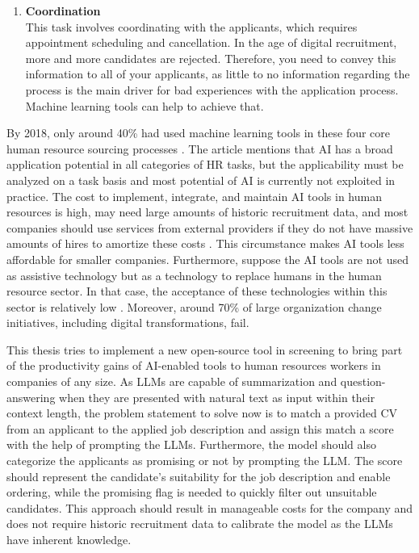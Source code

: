 \documentclass[draft,final]{thesisclass} %
\begin{document}
\begin{enumerate}
    \item \textbf{Coordination}\\
    This task involves coordinating with the applicants, which requires appointment scheduling and cancellation. In the age of digital recruitment, more and more candidates are rejected. Therefore, you need to convey this information to all of your applicants, as little to no information regarding the process is the main driver for bad experiences with the application process. Machine learning tools can help to achieve that.
\end{enumerate}
By 2018, only around 40\% had used machine learning tools in these four core human resource sourcing processes \parencite[4]{ai_recruiting}.
The article \textcite[167]{ai_techniques_in_hr} mentions that \acs{AI} has a broad application potential in all categories of \acs{HR} tasks, but the applicability must be analyzed on a task basis and most potential of \acs{AI} is currently not exploited in practice.
The cost to implement, integrate, and maintain \acs{AI} tools in human resources is high, may need large amounts of historic recruitment data, and most companies should use services from external providers if they do not have massive amounts of hires to amortize these costs \parencite[8]{ai_recruiting}.
This circumstance makes \acs{AI} tools less affordable for smaller companies.
Furthermore, suppose the \acs{AI} tools are not used as assistive technology but as a technology to replace humans in the human resource sector. In that case, the acceptance of these technologies within this sector is relatively low \parencite[9]{ai_recruiting}.
Moreover, around 70\% of large organization change initiatives, including digital transformations, fail.

This thesis tries to implement a new open-source tool in screening to bring part of the productivity gains of \acs{AI}-enabled tools to human resources workers in companies of any size.
As \gls{LLM}s are capable of summarization and question-answering when they are presented with natural text as input within their context length, the problem statement to solve now is to match a provided \acs{CV} from an applicant to the applied job description and assign this match a score with the help of prompting the \gls{LLM}s.
Furthermore, the model should also categorize the applicants as promising or not by prompting the \gls{LLM}.
The score should represent the candidate's suitability for the job description and enable ordering, while the promising flag is needed to quickly filter out unsuitable candidates.
This approach should result in manageable costs for the company and does not require historic recruitment data to calibrate the model as the \gls{LLM}s have inherent knowledge.
\end{document}
